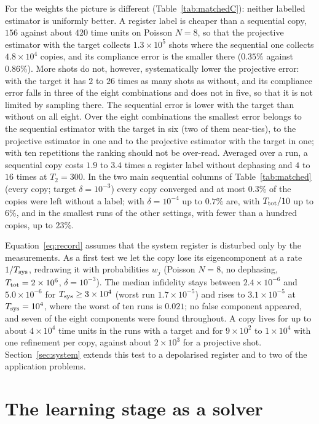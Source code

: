 \documentclass[journal]{IEEEtran}
\begin{document}
For the weights the picture is different (Table~\ref{tab:matchedC}): neither labelled estimator is uniformly better. A register label is cheaper than a sequential copy, $156$ against about $420$ time units on Poisson $N=8$, so that the projective estimator with the target collects $1.3\times10^5$ shots where the sequential one collects $4.8\times10^4$ copies, and its compliance error is the smaller there ($0.35\%$ against $0.86\%$). More shots do not, however, systematically lower the projective error: with the target it has $2$ to $26$ times as many shots as without, and its compliance error falls in three of the eight combinations and does not in five, so that it is not limited by sampling there. The sequential error is lower with the target than without on all eight. Over the eight combinations the smallest error belongs to the sequential estimator with the target in six (two of them near-ties), to the projective estimator in one and to the projective estimator with the target in one; with ten repetitions the ranking should not be over-read. Averaged over a run, a sequential copy costs $1.9$ to $3.4$ times a register label without dephasing and $4$ to $16$ times at $T_2=300$. In the two main sequential columns of Table~\ref{tab:matched} (every copy; target $\delta=10^{-3}$) every copy converged and at most $0.3\%$ of the copies were left without a label; with $\delta=10^{-4}$ up to $0.7\%$ are, with $T_{\rm tot}/10$ up to $6\%$, and in the smallest runs of the other settings, with fewer than a hundred copies, up to $23\%$.

Equation~\eqref{eq:record} assumes that the system register is disturbed only by the measurements. As a first test we let the copy lose its eigencomponent at a rate $1/T_{\rm sys}$, redrawing it with probabilities $w_j$ (Poisson $N=8$, no dephasing, $T_{\rm tot}=2\times10^6$, $\delta=10^{-3}$). The median infidelity stays between $2.4\times10^{-6}$ and $5.0\times10^{-6}$ for $T_{\rm sys}\ge3\times10^4$ (worst run $1.7\times10^{-5}$) and rises to $3.1\times10^{-5}$ at $T_{\rm sys}=10^4$, where the worst of ten runs is $0.021$; no false component appeared, and seven of the eight components were found throughout. A copy lives for up to about $4\times10^4$ time units in the runs with a target and for $9\times10^2$ to $1\times10^4$ with one refinement per copy, against about $2\times10^3$ for a projective shot. Section~\ref{sec:system} extends this test to a depolarised register and to two of the application problems.

\section{The learning stage as a solver}
\label{sec:solver}
\end{document}
